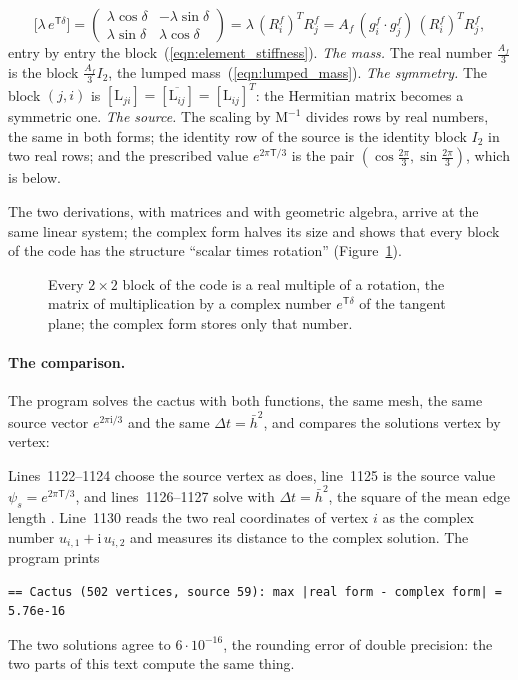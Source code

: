 \begin{equation*}
\big[\lambda\, e^{\mathsf T\delta}\big] = \begin{pmatrix}\lambda\cos\delta & -\lambda\sin\delta\\ \lambda\sin\delta & \lambda\cos\delta\end{pmatrix} = \lambda\,(R_i^f)^TR_j^f = A_f\,(g_i^f\cdot g_j^f)\,(R_i^f)^TR_j^f ,
\end{equation*}
entry by entry the block~(\ref{eqn:element_stiffness}). \emph{The mass.} The real number $\frac{A_f}{3}$ is the block $\frac{A_f}{3}I_2$, the lumped mass~(\ref{eqn:lumped_mass}). \emph{The symmetry.} The block $(j, i)$ is $[\mathrm L_{ji}] = [\overline{\mathrm L_{ij}}] = [\mathrm L_{ij}]^T$: the Hermitian matrix becomes a symmetric one. \emph{The source.} The scaling by $\mathrm M^{-1}$ divides rows by real numbers, the same in both forms; the identity row of the source is the identity block $I_2$ in two real rows; and the prescribed value $e^{2\pi\mathsf T/3}$ is the pair $(\cos\frac{2\pi}3, \sin\frac{2\pi}3)$, which is  below.

The two derivations, with matrices and with geometric algebra, arrive at the same linear system; the complex form halves its size and shows that every block of the code has the structure ``scalar times rotation'' (Figure~\ref{fig:complex_block}).
\begin{figure}[t]
\centering
{}
\caption{Every $2 \times 2$ block of the code is a real multiple of a rotation, the matrix of multiplication by a complex number $e^{\mathsf T \delta}$ of the tangent plane; the complex form stores only that number.}
\label{fig:complex_block}
\end{figure}

\paragraph{The comparison.} The program solves the cactus with both functions, the same mesh, the same source vector $e^{2\pi\mathrm i/3}$ and the same $\Delta t = \bar h^2$, and compares the solutions vertex by vertex:

Lines~1122--1124 choose the source vertex as  does, line~1125 is the source value $\psi_s = e^{2\pi\mathsf T/3}$, and lines~1126--1127 solve with $\Delta t = \bar h^2$, the square of the mean edge length . Line~1130 reads the two real coordinates of vertex $i$ as the complex number $u_{i,1} + \mathrm i\, u_{i,2}$ and measures its distance to the complex solution. The program prints
\begin{lstlisting}[numbers=none]
== Cactus (502 vertices, source 59): max |real form - complex form| = 5.76e-16
\end{lstlisting}
The two solutions agree to $6 \cdot 10^{-16}$, the rounding error of double precision: the two parts of this text compute the same thing.

